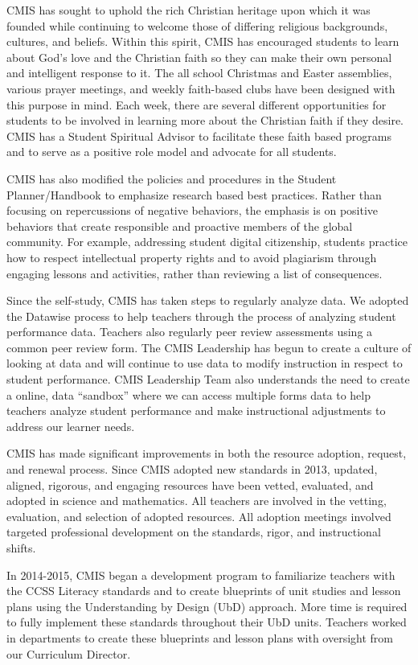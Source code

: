 CMIS has sought to uphold the rich Christian heritage upon which it was founded while continuing to welcome those of differing religious backgrounds, cultures, and beliefs. Within this spirit, CMIS has encouraged students to learn about God’s love and the Christian faith so they can make their own personal and intelligent response to it. The all school Christmas and Easter assemblies, various prayer meetings, and weekly faith-based clubs have been designed with this purpose in mind. Each week, there are several different opportunities for students to be involved in learning more about the Christian faith if they desire. CMIS has a Student Spiritual Advisor to facilitate these faith based programs and to serve as a positive role model and advocate for all students.

CMIS has also modified the policies and procedures in the Student Planner/Handbook to emphasize research based best practices. Rather than focusing on repercussions of negative behaviors, the emphasis is on positive behaviors that create responsible and proactive members of the global community.  For example, addressing student digital citizenship, students practice how to respect intellectual property rights and to avoid plagiarism through engaging lessons and activities, rather than reviewing a list of consequences. 

Since the self-study, CMIS has taken steps to regularly analyze data. We adopted the Datawise process to help teachers through the process of analyzing student performance data. Teachers also regularly peer review assessments using a common peer review form. The CMIS Leadership has begun to create a culture of looking at data and will continue to use data to modify instruction in respect to student performance. CMIS Leadership Team also understands the need to create a online, data “sandbox” where we can access multiple forms data to help teachers analyze student performance and make instructional adjustments to address our learner needs.

CMIS has made significant improvements in both the resource adoption, request, and renewal process. Since CMIS adopted new standards in 2013, updated, aligned, rigorous, and engaging resources have been vetted, evaluated, and adopted in science and mathematics. All teachers are involved in the vetting, evaluation, and selection of adopted resources. All adoption meetings involved targeted professional development on the standards, rigor, and instructional shifts. 

In 2014-2015, CMIS began a development program to familiarize teachers with the CCSS Literacy standards and to create blueprints of unit studies and lesson plans using the Understanding by Design (UbD) approach. More time is required to fully implement these standards throughout their UbD units. Teachers worked in departments to create these blueprints and lesson plans with oversight from our Curriculum Director.  

